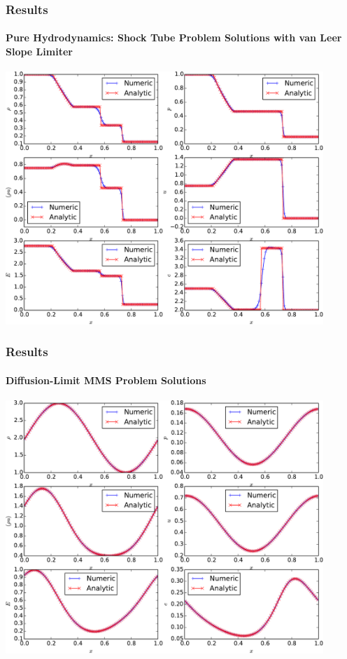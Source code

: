 \documentclass{beamer}
\begin{document}
\begin{frame}
\frametitle{Results}
\framesubtitle{Pure Hydrodynamics: Shock Tube Problem Solutions with van Leer
  Slope Limiter}

\begin{center}
\includegraphics[width=0.9\textwidth]{./figures/shock_tube.pdf}
\end{center}

\end{frame}
\begin{frame}
\frametitle{Results}
\framesubtitle{Diffusion-Limit MMS Problem Solutions}

\begin{center}
\includegraphics[width=0.9\textwidth]{./figures/MMS_solution.pdf}
\end{center}

\end{frame}
\end{document}

